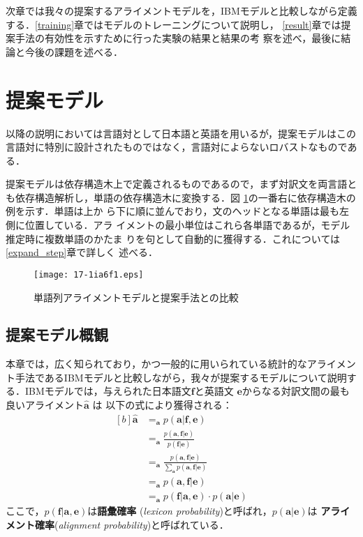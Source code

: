 \documentclass[japanese]{jnlp_1.4}
\newcommand{\argmax}{}
\begin{document}
次章では我々の提案するアライメントモデルを，IBMモデルと比較しながら定義
する．\ref{training}章ではモデルのトレーニングについて説明し，
\ref{result}章では提案手法の有効性を示すために行った実験の結果と結果の考
察を述べ，最後に結論と今後の課題を述べる．


\section{提案モデル}

以降の説明においては言語対として日本語と英語を用いるが，提案モデルはこの
言語対に特別に設計されたものではなく，言語対によらないロバストなものであ
る．

提案モデルは依存構造木上で定義されるものであるので，まず対訳文を両言語と
も依存構造解析し，単語の依存構造木に変換する．図
\ref{fig:word-based-alignment}の一番右に依存構造木の例を示す．単語は上か
ら下に順に並んでおり，文のヘッドとなる単語は最も左側に位置している．アラ
イメントの最小単位はこれら各単語であるが，モデル推定時に複数単語のかたま
りを句として自動的に獲得する．これについては\ref{expand_step}章で詳しく
述べる．

\begin{figure}[t]
 \begin{center}
  \texttt{[image: 17-1ia6f1.eps]}
 \end{center}
  \caption{単語列アライメントモデルと提案手法との比較}
  \label{fig:word-based-alignment}
\end{figure}


\subsection{提案モデル概観}

本章では，広く知られており，かつ一般的に用いられている統計的なアライメン
ト手法であるIBMモデルと比較しながら，我々が提案するモデルについて説明す
る．IBMモデル\cite{Brown93}では，与えられた日本語文$\mathbf{f}$と英語文
$\mathbf{e}$からなる対訳文間の最も良いアライメント$\mathbf{\hat{a}}$ は
以下の式により獲得される：
\begin{equation}
 \label{eq:best}
\begin{aligned}[b]
 \hat{\mathbf{a}} & = \argmax_{\mathbf{a}} p(\mathbf{a} | \mathbf{f}, \mathbf{e})\\
   & = \argmax_{\mathbf{a}} \frac{p(\mathbf{a}, \mathbf{f} | \mathbf{e})}{p(\mathbf{f} | \mathbf{e})}\\
   & = \argmax_{\mathbf{a}} \frac{p(\mathbf{a}, \mathbf{f} | \mathbf{e})}{\sum_\mathbf{a} p(\mathbf{a}, \mathbf{f} | \mathbf{e})} \\
   & = \argmax_{\mathbf{a}} p(\mathbf{a}, \mathbf{f} | \mathbf{e}) \\
   & = \argmax_{\mathbf{a}} p(\mathbf{f}|\mathbf{a}, \mathbf{e}) \cdot p(\mathbf{a}|\mathbf{e})
\end{aligned}
\end{equation}
ここで，$p(\mathbf{f}|\mathbf{a}, \mathbf{e})$は{\bf 語彙確率}
(\textit{lexicon probability})と呼ばれ，$p(\mathbf{a}|\mathbf{e})$は{\bf 
アライメント確率}(\textit{alignment probability})と呼ばれている．
\end{document}
